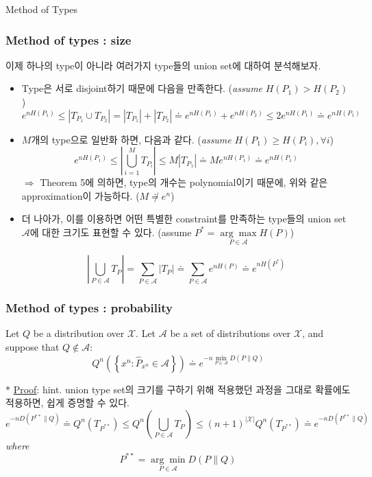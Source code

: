 \documentclass[9pt]{beamer}
\begin{document}
    \begin{section}{Method of Types}
        \begin{frame}
            \frametitle{Method of types : size}
            이제 하나의 type이 아니라 여러가지 type들의 union set에 대하여 분석해보자.

            \begin{itemize}
                \item Type은 서로 disjoint하기 때문에 다음을 만족한다. (\textit{assume} $H(P_1) > H(P_2)$)
                $$ e^{n H(P_1)} \le |T_{P_1} \cup T_{P_2}| = |T_{P_1}| + |T_{P_2}| \doteq e^{nH(P_1)} + e^{nH(P_2)}  \le {2}e^{nH(P_1)} \doteq \boxed{ e^{nH(P_1)}}$$ %
                \item $M$개의 type으로 일반화 하면, 다음과 같다. (\textit{assume} $H(P_1) \ge H(P_i), \forall i$)
                $$
                e^{n H\left(P_1\right)} \leq\left|\bigcup_{i=1}^M T_{P_i}\right| \leq M\left|T_{P_1}\right| \doteq {M e^{n H\left(P_1\right)}} \doteq \boxed{ e^{n H\left(P_1\right)}}
                $$
                $\Rightarrow$ Theorem 5에 의하면, type의 개수는 \alert{polynomial}이기 때문에, 위와 같은 approximation이 가능하다. ($M \not \doteq e^n$)
                \item 더 나아가, 이를 이용하면 어떤 특별한 constraint를 만족하는 type들의 union set $\mathcal A$에 대한 크기도 표현할 수 있다. (assume $P^*=\underset{P \in \mathcal A}{\arg \max } H(P)$)
                
                $$
                \left|\bigcup_{P \in \mathcal{A}} T_P\right|=\sum_{P \in \mathcal{A}}\left|T_P\right| \doteq \sum_{P \in \mathcal{A}} e^{n H(P)} \doteq \boxed{ e^{n H\left(P^*\right)}}
                $$

            \end{itemize}
        \end{frame}

        \begin{frame}
            \frametitle{Method of types : probability}
            \begin{theorem}
                Let $Q$ be a distribution over $\mathcal X$. Let $\mathcal A$ be a set of distributions over $\mathcal X$, and suppose that $Q \notin \mathcal A$:
                $$ Q^n\left(\left\{x^n: \hat{P}_{x^n} \in \mathcal{A}\right\}\right) \doteq e^{-n \min _{P \in \mathcal{A}} D(P \| Q)} $$
            \end{theorem}
            \vspace{0.2cm}
            $\ast$ \underline{Proof}: hint. union type set의 크기를 구하기 위해 적용했던 과정을 그대로 확률에도 적용하면, 쉽게 증명할 수 있다.
            $$
            e^{-n D(P^{**} \| Q)} \doteq Q^n\left(T_{P^{**}}\right) \leq Q^n\left(\bigcup_{P \in \mathcal{A}} T_P\right) \leq(n+1)^{|\mathcal X|} Q^n\left(T_{P^{**}}\right) \doteq e^{-n D(P^{**} \| Q)}
            $$
            \textit{where}
            $$
            P^{* *}=\underset{P \in \mathcal{A}}{\arg \min } D(P \| Q)
            $$


\end{frame}
\end{section}
\end{document}
